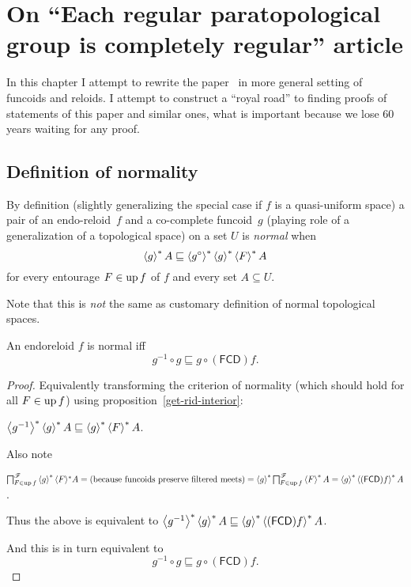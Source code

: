 \chapter{On ``Each regular paratopological group is completely regular'' article}

In this chapter I attempt to rewrite the paper~\cite{2014arXiv1410.1504B} in more general setting of funcoids and reloids.
I attempt to construct a ``royal road'' to finding proofs of statements of this paper and similar ones, what is
important because we lose 60 years waiting for any proof.

\section{Definition of normality}

By definition (slightly generalizing the special case if $f$ is a
quasi-uniform space) a pair of an endo-reloid~$f$ and a co-complete funcoid~$g$ (playing role of a generalization of a topological space)
on a set $U$ is \emph{normal} when
\[ \left\langle g\right\rangle ^{\ast} A \sqsubseteq \left\langle 
g^{\circ}\right\rangle ^{\ast} \left\langle g \right\rangle ^{\ast} \left\langle F\right\rangle ^{\ast} A \] for every entourage $F \in
\operatorname{up} f$ of $f$ and every set $A \subseteq U$.

Note that this is \emph{not} the same as customary definition of normal topological spaces.

\begin{thm}
  An endoreloid $f$ is normal iff
  \[ g^{- 1} \circ g \sqsubseteq
  g \circ (\mathsf{FCD}) f. \]
\end{thm}

\begin{proof}
  Equivalently transforming the criterion of normality (which should hold for
  all $F \in \operatorname{up} f$) using proposition~\ref{get-rid-interior}:

  $\left\langle g^{- 1}\right\rangle ^{\ast}
  \left\langle g\right\rangle ^{\ast} A \sqsubseteq
  \left\langle g\right\rangle ^{\ast} \left\langle F\right\rangle ^{\ast} A$.

  Also note
  
  $\bigsqcap^{\mathscr{F}}_{F \in \operatorname{up} f} \left\langle  g
  \right\rangle ^{\ast} \langle F \rangle^{\ast} A = \text{(because funcoids preserve
  filtered meets)} = \left\langle  g
  \right\rangle ^{\ast}  \bigsqcap^{\mathscr{F}}_{F \in \operatorname{up} f} \left\langle F\right\rangle ^{\ast} A =
  \left\langle  g \right\rangle ^{\ast}
  \left\langle  (\mathsf{FCD}) f \right\rangle ^{\ast} A$.

  Thus the above is equivalent to
  $\left\langle g^{-1}\right\rangle ^{\ast}
  \left\langle g\right\rangle ^{\ast} A \sqsubseteq
  \left\langle  g \right\rangle ^{\ast}
  \left\langle  (\mathsf{FCD}) f \right\rangle ^{\ast} A$.

  And this is in turn equivalent to
  \[ g^{-1} \circ g \sqsubseteq
  g \circ (\mathsf{FCD}) f. \]
\end{proof}

